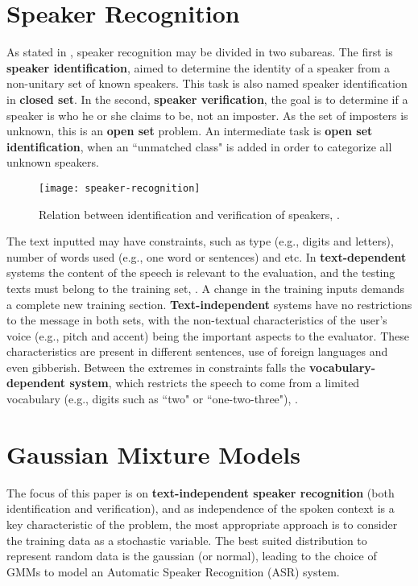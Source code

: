 \section{Speaker Recognition}
\label{sec:speaker-recognition}

As stated in , speaker recognition may be divided in two subareas. The first is \textbf{speaker identification}, aimed to determine the identity of a speaker from a non-unitary set of known speakers. This task is also named speaker identification in \textbf{closed set}. In the second, \textbf{speaker verification}, the goal is to determine if a speaker is who he or she claims to be, not an imposter. As the set of imposters is unknown, this is an \textbf{open set} problem. An intermediate task is \textbf{open set identification}, when an ``unmatched class" is added in order to categorize all unknown speakers.

\begin{figure}[ht]
    \centering
    \texttt{[image: speaker-recognition]}
    \caption{Relation between identification and verification of speakers, .}
    \label{fig:speaker-recognition}
\end{figure}

The text inputted may have constraints, such as type (e.g., digits and letters), number of words used (e.g., one word or sentences) and etc. In \textbf{text-dependent} systems the content of the speech is relevant to the evaluation, and the testing texts must belong to the training set, . A change in the training inputs demands a complete new training section. \textbf{Text-independent} systems have no restrictions to the message in both sets, with the non-textual characteristics of the user's voice (e.g., pitch and accent) being the important aspects to the evaluator. These characteristics are present in different sentences, use of foreign languages and even gibberish. Between the extremes in constraints falls the \textbf{vocabulary-dependent system}, which restricts the speech to come from a limited vocabulary (e.g., digits such as ``two" or ``one-two-three"), .

\section{Gaussian Mixture Models}
\label{sec:gmm}

The focus of this paper is on \textbf{text-independent speaker recognition} (both identification and verification), and as independence of the spoken context is a key characteristic of the problem, the most appropriate approach is to consider the training data as a stochastic variable. The best suited distribution to represent random data is the gaussian (or normal), leading to the choice of GMMs to model an Automatic Speaker Recognition (ASR) system.

